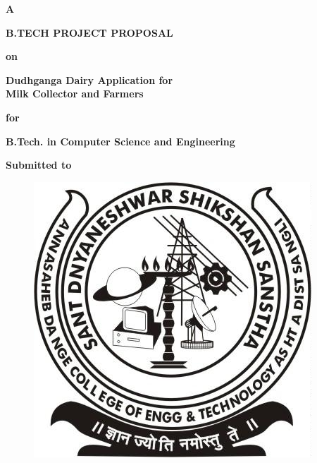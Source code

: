 \documentclass[english]{article}
\begin{document}
\pagestyle{empty}


\begin{center}
\textbf{\large A}{\LARGE{} }
\end{center}
\begin{center}
\textbf{\LARGE B.TECH PROJECT PROPOSAL}{\LARGE{} }
\end{center}

\begin{center}
\textbf{\large on}
\end{center}

\begin{center}
\textbf{\Large Dudhganga Dairy Application for }\\
\vspace{8pt}
\textbf{\Large Milk Collector and Farmers}
\end{center}

\vspace{2pt}
\begin{center}
{\textbf{\large for} } 
\end{center}

\begin{center}
\textbf{\Large B.Tech. in Computer Science and Engineering}
\end{center}

\begin{center}
{ \textbf{\large Submitted to}} 
\end{center}
\vspace{2pt}
\begin{figure}[H]
\centering
\includegraphics[scale=0.8]{logo.jpeg}
\end{figure}
\end{document}
